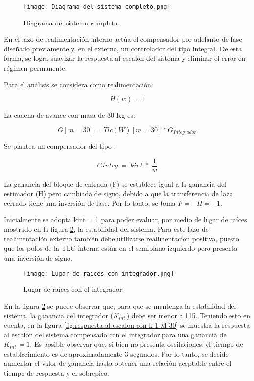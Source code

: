 \begin{figure}[H]
	\centering
	\texttt{[image: Diagrama-del-sistema-completo.png]}
	\caption{Diagrama del sistema completo.}
	\label{fig:diagrama-del-sistema-completo}
\end{figure}


\noindent En el lazo de realimentaci\'{o}n interno act\'{u}a el compensador por adelanto de fase dise\~{n}ado previamente y, en el externo, un controlador del tipo integral. De esta forma, se logra suavizar la respuesta al escal\'{o}n del sistema y eliminar el error en r\'{e}gimen permanente.


\noindent Para el an\'{a}lisis se considera como realimentaci\'{o}n: 

\[H(w)=1\] 

\noindent La cadena de avance con masa de 30 Kg es:

\[G[m=30]=Tlc(W)[m=30]*G_{Integrador}\] 

\noindent Se  plantea un compensador del tipo :

\[Ginteg\ =\ kint\ *\ \frac{1}{w}\] 

\noindent La ganancia del bloque de entrada (F) se establece igual a la ganancia del estimador (H) pero cambiada de signo, debido a que la transferencia de lazo cerrado tiene una inversi\'{o}n de fase. Por lo tanto, se toma $F=-H=-1$.

\noindent Inicialmente se adopta kint = 1 para poder evaluar, por medio de lugar de ra\'{i}ces mostrado en la figura \ref{fig:lugar-de-raices-con-integrador}, la estabilidad del sistema. Para este lazo de realimentaci\'{o}n externo tambi\'{e}n debe utilizarse realimentaci\'{o}n positiva, puesto que los polos de la TLC interna est\'{a}n en el semiplano izquierdo pero presenta una inversi\'{o}n de signo.


\begin{figure}[H]
	\centering
	\texttt{[image: Lugar-de-raices-con-integrador.png]}
	\caption{Lugar de raíces con el integrador.}
	\label{fig:lugar-de-raices-con-integrador}
\end{figure}


\noindent En la figura \ref{fig:lugar-de-raices-con-integrador} se puede observar que, para que se mantenga la estabilidad del sistema, la ganancia del integrador ($K_{int\ }$) debe ser menor a 115. Teniendo esto en cuenta, en la figura \ref{fig:respuesta-al-escalon-con-k-1-M-30} se muestra la respuesta al escal\'{o}n del sistema compensado con el integrador para una ganancia de $K_{int\ }=1$.  Es posible observar que, si bien no presenta oscilaciones, el tiempo de establecimiento es de aproximadamente 3 segundos. Por lo tanto, se decide aumentar el valor de ganancia hasta obtener una relaci\'{o}n aceptable entre el tiempo de respuesta y el sobrepico.


